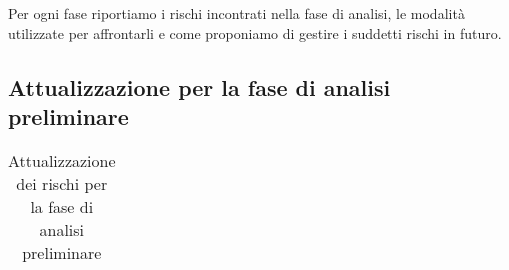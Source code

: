 \documentclass[../piano-di-progetto]{subfiles}
\begin{document}
Per ogni fase riportiamo i rischi incontrati nella fase di analisi, le modalità utilizzate per affrontarli e come proponiamo di gestire i suddetti rischi in futuro.

\subsection{Attualizzazione per la fase di analisi preliminare}%
\label{sub:attualizzazione_fase_analisi_preliminare}
\begin{longtable}[H]{|p{10em}|p{17em}|p{17em}|}
  \caption{Attualizzazione dei rischi per la fase di analisi preliminare}%
  \label{tab:attualizzazione_fase_analisi_preliminare}                                                                                                                                                                                                                                                                                                                                                                                                                         \\


\end{longtable}
\end{document}
